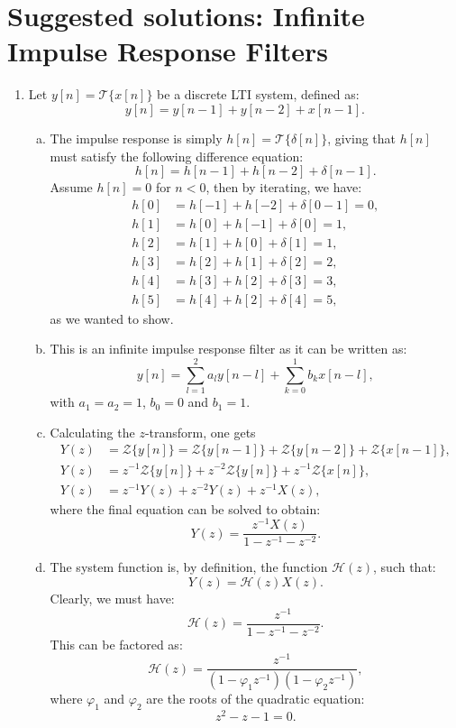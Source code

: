\newpage
\section{Suggested solutions: Infinite Impulse Response Filters}

\begin{enumerate}
\item Let $y[n]=\mathcal{T}\{x[n]\}$ be a discrete LTI system, defined as:
$$y[n]=y[n-1]+y[n-2]+x[n-1].$$

\begin{enumerate}[a)]
\item The impulse response is simply $h[n]=\mathcal{T}\{\delta[n]\}$, giving that $h[n]$ must satisfy the following difference equation:
$$h[n]=h[n-1]+h[n-2]+\delta[n-1].$$
Assume $h[n]=0$ for $n<0$, then by iterating, we have:
\begin{align*}
    h[0]&= h[-1] + h[-2] + \delta[0-1]=0, \\
    h[1]&= h[0]  + h[-1] + \delta[0]=1, \\
    h[2]&= h[1]  + h[0]  + \delta[1]=1, \\
    h[3]&= h[2]  + h[1]  + \delta[2]=2, \\
    h[4]&= h[3]  + h[2]  + \delta[3]=3, \\
    h[5]&= h[4]  + h[2]  + \delta[4]=5, 
\end{align*}
as we wanted to show.

\item This is an infinite impulse response filter as it can be written as:
$$y[n]=\sum_{l=1}^{2} a_{l}y[n-l]+\sum_{k=0}^{1} b_{k}x[n-l],$$
with $a_{1}=a_{2}=1$, $b_{0}=0$ and $b_{1}=1$. 

\item Calculating the $z$-transform, one gets
\begin{align*}
    Y(z)&=\mathcal{Z}\{y[n]\}=\mathcal{Z}\{y[n-1]\}+\mathcal{Z}\{y[n-2]\}+\mathcal{Z}\{x[n-1]\}, \\
    Y(z)&=z^{-1}\mathcal{Z}\{y[n]\} + z^{-2}\mathcal{Z}\{y[n]\} + z^{-1}\mathcal{Z}\{x[n]\}, \\
    Y(z)&=z^{-1}Y(z) + z^{-2}Y(z) + z^{-1}X(z),
\end{align*}
where the final equation can be solved to obtain:
$$Y(z)=\frac{z^{-1}X(z)}{1-z^{-1}-z^{-2}}.$$

\item The system function is, by definition, the function $\mathcal{H}(z)$, such that:
$$Y(z)=\mathcal{H}(z)X(z).$$
Clearly, we must have:
$$\mathcal{H}(z)=\frac{z^{-1}}{1-z^{-1}-z^{-2}}.$$
This can be factored as:
$$\mathcal{H}(z)=\frac{z^{-1}}{(1-\varphi_{1}z^{-1})(1-\varphi_{2}z^{-1})},$$
where $\varphi_{1}$ and $\varphi_{2}$ are the roots of the quadratic equation:
$$z^{2}-z-1=0.$$


\end{enumerate}
\end{enumerate}

